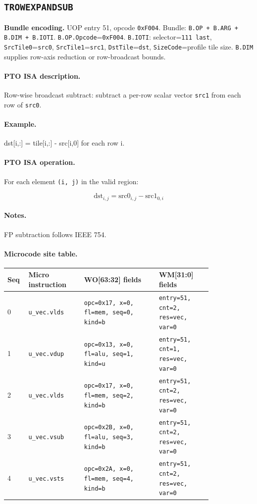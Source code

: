\subsection{\texttt{TROWEXPANDSUB}}
\noindent\textbf{Bundle encoding.} UOP entry 51, opcode \texttt{0xF004}. Bundle: \texttt{B.OP + B.ARG + B.DIM + B.IOTI}. \texttt{B.OP.Opcode}=\texttt{0xF004}. \texttt{B.IOTI}: selector=\texttt{111 last}, \texttt{SrcTile0}=\texttt{src0}, \texttt{SrcTile1}=\texttt{src1}, \texttt{DstTile}=\texttt{dst}, \texttt{SizeCode}=profile tile size. \texttt{B.DIM} supplies row-axis reduction or row-broadcast bounds.\par\smallskip
{\small
\paragraph{PTO ISA description.}
Row-wise broadcast subtract: subtract a per-row scalar vector \texttt{src1} from each row of \texttt{src0}.
\paragraph{Example.}
dst[i,:] = tile[i,:] - src[i,0] for each row i.
\par\smallskip
\paragraph{PTO ISA operation.}
For each element \texttt{(i, j)} in the valid region:

\[
\mathrm{dst}_{i,j} = \mathrm{src0}_{i,j} - \mathrm{src1}_{0,i}
\]
}\par\smallskip
\paragraph{Notes.}
FP subtraction follows IEEE 754.
\paragraph{Microcode site table.}
{\scriptsize
\begin{longtable}{@{}R{0.055\linewidth}L{0.23\linewidth}L{0.31\linewidth}L{0.22\linewidth}@{}}
\toprule
Seq & Micro instruction & WO[63:32] fields & WM[31:0] fields \\
 & \texttt{u\_vec.vlds} & \texttt{opc=0x17, x=0, fl=mem, seq=0, kind=b} & \texttt{entry=51, cnt=2, res=vec, var=0} \\
1 & \texttt{u\_vec.vdup} & \texttt{opc=0x13, x=0, fl=alu, seq=1, kind=u} & \texttt{entry=51, cnt=1, res=vec, var=0} \\
2 & \texttt{u\_vec.vlds} & \texttt{opc=0x17, x=0, fl=mem, seq=2, kind=b} & \texttt{entry=51, cnt=2, res=vec, var=0} \\
3 & \texttt{u\_vec.vsub} & \texttt{opc=0x2B, x=0, fl=alu, seq=3, kind=b} & \texttt{entry=51, cnt=2, res=vec, var=0} \\
4 & \texttt{u\_vec.vsts} & \texttt{opc=0x2A, x=0, fl=mem, seq=4, kind=b} & \texttt{entry=51, cnt=2, res=vec, var=0} \\
\bottomrule
\end{longtable}
}

